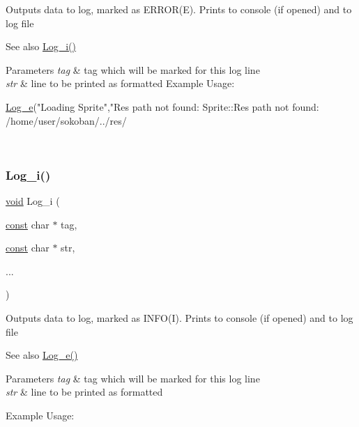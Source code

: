 Outputs data to log, marked as E\+R\+R\+O\+R(\+E). Prints to console (if opened) and to log file \begin{DoxySeeAlso}{See also}
\hyperlink{group___core_ga1160e13b7fea6357aae71e25703481de}{Log\+\_\+i()} 
\end{DoxySeeAlso}

\begin{DoxyParams}{Parameters}
{\em tag} & tag which will be marked for this log line \\
\hline
{\em str} & line to be printed as formatted Example Usage\+: 
\begin{DoxyCode}
\hyperlink{group___core_ga5a29994cc1a93c0124f65b27a5daa5aa}{Log\_e}(\textcolor{stringliteral}{"Loading Sprite"},\textcolor{stringliteral}{"Res path not found:%
       Sprite::Res path not found: /home/user/sokoban/../res/}
\end{DoxyCode}
 \\
\hline
\end{DoxyParams}
\mbox{\label{group___core_ga1160e13b7fea6357aae71e25703481de}} 
\subsubsection{\texorpdfstring{Log\+\_\+i()}{Log\_i()}}
{\footnotesize\ttfamily \hyperlink{png_8h_ac9c84fa68bbad002983e35ce3663c686}{void} Log\+\_\+i (\begin{DoxyParamCaption}\item[{\hyperlink{zconf_8h_a2c212835823e3c54a8ab6d95c652660e}{const} char $\ast$}]{tag,  }\item[{\hyperlink{zconf_8h_a2c212835823e3c54a8ab6d95c652660e}{const} char $\ast$}]{str,  }\item[{}]{... }\end{DoxyParamCaption})}

Outputs data to log, marked as I\+N\+F\+O(\+I). Prints to console (if opened) and to log file \begin{DoxySeeAlso}{See also}
\hyperlink{group___core_ga5a29994cc1a93c0124f65b27a5daa5aa}{Log\+\_\+e()} 
\end{DoxySeeAlso}

\begin{DoxyParams}{Parameters}
{\em tag} & tag which will be marked for this log line \\
\hline
{\em str} & line to be printed as formatted\\
\hline
\end{DoxyParams}
Example Usage\+: 
 \mbox{\label{group___core_ga26169da7eb509dc305939ffabf06ac58}} 
